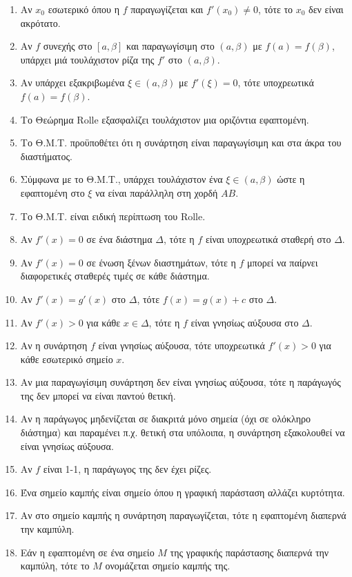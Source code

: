 \documentclass[11pt,a4paper]{article}
\newcommand{\eng}[1]{\selectlanguage{english}#1\selectlanguage{greek}}
\begin{document}
\begin{enumerate}[label=\textbf{2.\arabic*.}]
    \item Αν $x_0$ εσωτερικό όπου η $f$ παραγωγίζεται και $f'(x_0) \ne 0$, τότε το $x_0$ δεν είναι ακρότατο.
    \item Αν $f$ συνεχής στο $[a, \beta]$ και παραγωγίσιμη στο $(a, \beta)$ με $f(a)=f(\beta)$, υπάρχει μιά τουλάχιστον ρίζα της $f'$ στο $(a, \beta)$.
    \item Αν υπάρχει εξακριβωμένα $\xi \in (a, \beta)$ με $f'(\xi)=0$, τότε υποχρεωτικά $f(a)=f(\beta)$.
    \item Το Θεώρημα \eng{Rolle} εξασφαλίζει τουλάχιστον μια οριζόντια εφαπτομένη.
    \item Το Θ.Μ.Τ. προϋποθέτει ότι η συνάρτηση είναι παραγωγίσιμη και στα άκρα του διαστήματος.
    \item Σύμφωνα με το Θ.Μ.Τ., υπάρχει τουλάχιστον ένα $\xi \in (a, \beta)$ ώστε η εφαπτομένη στο $\xi$ να είναι παράλληλη στη χορδή $AB$.
    \item Το Θ.Μ.Τ. είναι ειδική περίπτωση του \eng{Rolle}.
    \item Αν $f'(x) = 0$ σε ένα διάστημα $\Delta$, τότε η $f$ είναι υποχρεωτικά σταθερή στο $\Delta$.
    \item Αν $f'(x) = 0$ σε ένωση ξένων διαστημάτων, τότε η $f$ μπορεί να παίρνει διαφορετικές σταθερές τιμές σε κάθε διάστημα.
    \item Αν $f'(x) = g'(x)$ στο $\Delta$, τότε $f(x) = g(x) + c$ στο $\Delta$.
    \item Αν $f'(x) > 0$ για κάθε $x \in \Delta$, τότε η $f$ είναι γνησίως αύξουσα στο $\Delta$.
    \item Αν η συνάρτηση $f$ είναι γνησίως αύξουσα, τότε υποχρεωτικά $f'(x) > 0$ για κάθε εσωτερικό σημείο $x$.
    \item Αν μια παραγωγίσιμη συνάρτηση δεν είναι γνησίως αύξουσα, τότε η παράγωγός της δεν μπορεί να είναι παντού θετική.
    \item Αν η παράγωγος μηδενίζεται σε διακριτά μόνο σημεία (όχι σε ολόκληρο διάστημα) και παραμένει π.χ. θετική στα υπόλοιπα, η συνάρτηση εξακολουθεί να είναι γνησίως αύξουσα. 
    \item Αν $f$ είναι 1-1, η παράγωγος της δεν έχει ρίζες.
    \item Ένα σημείο καμπής είναι σημείο όπου η γραφική παράσταση αλλάζει κυρτότητα.
    \item Αν στο σημείο καμπής η συνάρτηση παραγωγίζεται, τότε η εφαπτομένη διαπερνά την καμπύλη.
    \item Εάν η εφαπτομένη σε ένα σημείο $M$ της γραφικής παράστασης διαπερνά την καμπύλη, τότε το $M$ ονομάζεται σημείο καμπής της.

\end{enumerate}
\end{document}
